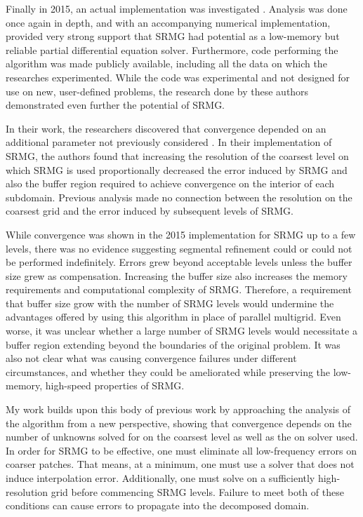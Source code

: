 \documentclass[final]{siamart1116}
\numberwithin{theorem}{section}
\begin{document}
    Finally in 2015, an actual implementation was investigated \cite{paper1}. Analysis was done once again in depth, and with an accompanying numerical implementation, provided very strong support that SRMG had potential as a low-memory but reliable partial differential equation solver. Furthermore, code performing the algorithm was made publicly available, including all the data on which the researches experimented. While the code was experimental and not designed for use on new, user-defined problems, the research done by these authors demonstrated even further the potential of SRMG.
    
    In their work, the researchers discovered that convergence depended on an additional parameter not previously considered \cite{paper1}. In their  implementation of SRMG, the authors found that increasing the resolution of the coarsest level on which SRMG is used proportionally decreased the error induced by SRMG and also the buffer region required to achieve convergence on the interior of each subdomain. Previous analysis made no connection between the resolution on the coarsest grid and the error induced by subsequent levels of SRMG.
    
    While convergence was shown in the 2015 implementation for SRMG up to a few levels, there was no evidence suggesting segmental refinement could or could not be performed indefinitely. Errors grew beyond acceptable levels unless the buffer size grew as compensation. Increasing the buffer size also increases the memory requirements and computational complexity of SRMG. Therefore, a requirement that buffer size grow with the number of SRMG levels would undermine the advantages offered by using this algorithm in place of parallel multigrid. Even worse, it was unclear whether a large number of SRMG levels would necessitate a buffer region extending beyond the boundaries of the original problem. It was also not clear what was causing convergence failures under different circumstances, and whether they could be ameliorated while preserving the low-memory, high-speed properties of SRMG. 
    
    My work builds upon this body of previous work by approaching the analysis of the algorithm from a new perspective, showing that convergence depends on the number of unknowns solved for on the coarsest level as well as the on solver used. In order for SRMG to be effective, one must eliminate all low-frequency errors on coarser patches. That means, at a minimum, one must use a solver that does not induce interpolation error.  Additionally, one must solve on a sufficiently high-resolution grid before commencing SRMG levels. Failure to meet both of these conditions can cause errors to propagate into the decomposed domain. 
    
\end{document}
